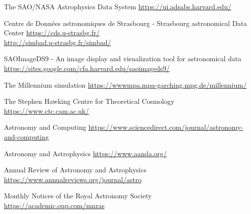 \begin{wwteorema}{The SAO/NASA Astrophysics Data System}
\href{https://ui.adsabs.harvard.edu/}{https://ui.adsabs.harvard.edu/}
\end{wwteorema}

\begin{wwteorema}{Centre de Données astronomiques de Strasbourg - 
Strasbourg astronomical Data Center}
\href{https://cds.u-strasbg.fr/}{https://cds.u-strasbg.fr/} \\
\href{http://simbad.u-strasbg.fr/simbad/}{http://simbad.u-strasbg.fr/simbad/ \citet{simbad}}
\end{wwteorema}

\begin{wwteorema}{SAOImageDS9 - 
An image display and visualization tool for astronomical data}
\href{https://sites.google.com/cfa.harvard.edu/saoimageds9/}{https://sites.google.com/cfa.harvard.edu/saoimageds9/}
\end{wwteorema}

\begin{wwteorema}{The Millennium simulation}
\href{https://wwwmpa.mpa-garching.mpg.de/millennium/}{https://wwwmpa.mpa-garching.mpg.de/millennium/}
\end{wwteorema}

\begin{wwteorema}{The Stephen Hawking Centre for Theoretical Cosmology}
\href{https://www.ctc.cam.ac.uk/}{https://www.ctc.cam.ac.uk/}
\end{wwteorema}

\begin{wwteorema}{Astronomy and Computing}
\href{https://www.sciencedirect.com/journal/astronomy-and-computing}{https://www.sciencedirect.com/journal/astronomy-and-computing}
\end{wwteorema}

\begin{wwteorema}{Astronomy and Astrophysics}
\href{https://www.aanda.org/}{https://www.aanda.org/}
\end{wwteorema}

\begin{wwteorema}{Annual Review of Astronomy and Astrophysics}
\href{https://www.annualreviews.org/journal/astro}{https://www.annualreviews.org/journal/astro}
\end{wwteorema}

\begin{wwteorema}{Monthly Notices of the Royal Astronomy Society}
\href{https://academic.oup.com/mnras}{https://academic.oup.com/mnras}
\end{wwteorema}

